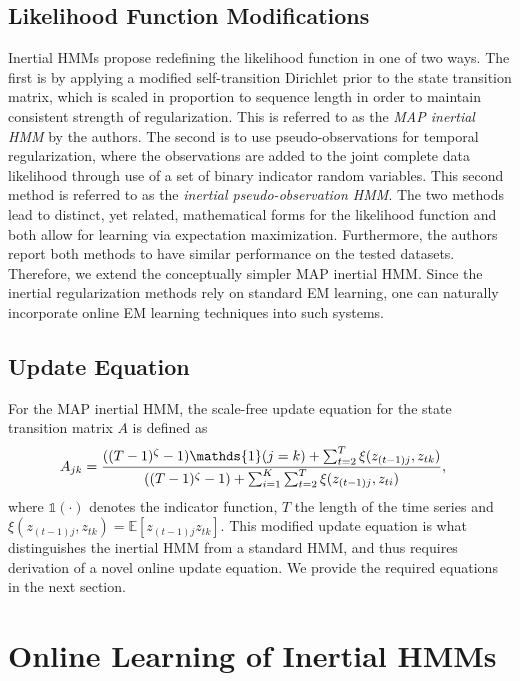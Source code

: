 \documentclass{article}
\begin{document}
\subsection{Likelihood Function Modifications}
Inertial HMMs propose redefining the likelihood function in one of two ways. The first is by applying a modified self-transition Dirichlet prior to the state transition matrix, which is scaled in proportion to sequence length in order to maintain consistent strength of regularization. This is referred to as the \emph{MAP inertial HMM} by the authors. The second is to use pseudo-observations for temporal regularization, where the observations are added to the joint complete data likelihood through use of a set of binary indicator random variables. This second method is referred to as the \emph{inertial pseudo-observation HMM}. The two methods lead to distinct, yet related, mathematical forms for the likelihood function and both allow for learning via expectation maximization. Furthermore, the authors report both methods to have similar performance on the tested datasets. Therefore, we extend the conceptually simpler MAP inertial HMM. Since the inertial regularization methods rely on standard EM learning, one can naturally incorporate online EM learning techniques into such systems.

\subsection{Update Equation}

For the MAP inertial HMM, the scale-free update equation for the state transition matrix $A$ is defined as
\begin{align}\label{eq:SCALE-FREE-MAP}
  \setlength{\abovedisplayskip}{0pt}
  \setlength{\belowdisplayskip}{0pt}
    A_{jk} &= \frac{((T - 1)^{\zeta}-1){\mathds{1}(j = k)} + \sum_{t=2}^{T} \xi(z_{(t-1)j}, z_{tk})}   
    {((T - 1)^{\zeta} - 1) + \sum_{i=1}^{K}\sum_{t=2}^{T} \xi(z_{(t-1)j}, z_{ti})},
\end{align}
where $\mathds{1}(\cdot)$ denotes the indicator function, $T$ the length of the time series and $\xi(z_{(t-1)j}, z_{tk})=\mathds{E}[z_{(t-1)j}z_{tk}]$. This modified update equation is what distinguishes the inertial HMM from a standard HMM, and thus requires derivation of a novel online update equation. We provide the required equations in the next section.

\section{Online Learning of Inertial HMMs}
\end{document}
